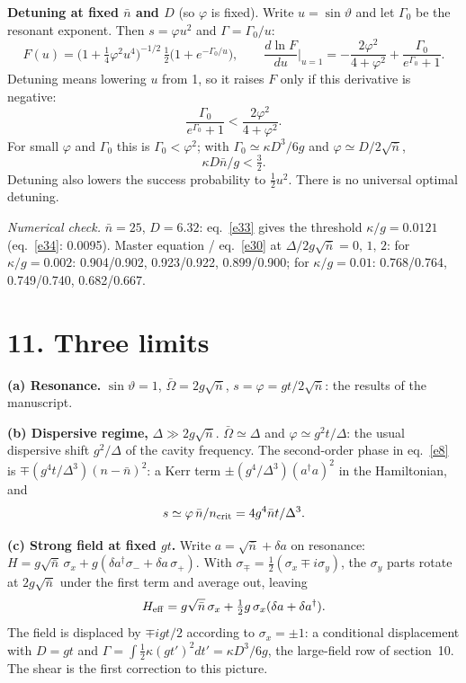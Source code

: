 \documentclass[11pt,letterpaper]{article}
\newcommand{\nbar}{\bar{n}}
\newcommand{\ncrit}{n_{\rm crit}}
\newcommand{\Obar}{\bar{\Omega}}
\newcommand{\numcheck}[1]{\par{\small\textit{Numerical check.} #1}\par}
\begin{document}
\textbf{Detuning at fixed $\nbar$ and $D$} (so $\varphi$ is fixed). Write $u=\sin\vartheta$ and let
$\Gamma_0$ be the resonant exponent. Then $s=\varphi u^2$ and $\Gamma=\Gamma_0/u$:
\[
F(u)=\bigl(1+\tfrac14\varphi^2u^4\bigr)^{-1/2}\,\tfrac12\bigl(1+e^{-\Gamma_0/u}\bigr),\qquad
\frac{d\ln F}{du}\Big|_{u=1}=-\frac{2\varphi^2}{4+\varphi^2}+\frac{\Gamma_0}{e^{\Gamma_0}+1}.
\]
Detuning means lowering $u$ from 1, so it raises $F$ only if this derivative is negative:
\begin{equation}\label{e33}
\frac{\Gamma_0}{e^{\Gamma_0}+1}<\frac{2\varphi^2}{4+\varphi^2}.
\end{equation}
For small $\varphi$ and $\Gamma_0$ this is $\Gamma_0<\varphi^2$; with $\Gamma_0\simeq\kappa D^3/6g$ and
$\varphi\simeq D/2\sqrt{\nbar}$,
\begin{equation}\label{e34}
\kappa D\nbar/g<\tfrac32 .
\end{equation}
Detuning also lowers the success probability to $\tfrac12u^2$. There is no universal optimal detuning.
\numcheck{$\nbar=25$, $D=6.32$: eq.~\eqref{e33} gives the threshold $\kappa/g=0.0121$ (eq.~\eqref{e34}: 0.0095). Master
equation / eq.~\eqref{e30} at $\Delta/2g\sqrt{\nbar}=0,\,1,\,2$: for $\kappa/g=0.002$: 0.904/0.902, 0.923/0.922,
0.899/0.900; for $\kappa/g=0.01$: 0.768/0.764, 0.749/0.740, 0.682/0.667.}

\section*{11. Three limits}
\textbf{(a) Resonance.} $\sin\vartheta=1$, $\Obar=2g\sqrt{\nbar}$, $s=\varphi=gt/2\sqrt{\nbar}$: the results
of the manuscript.

\textbf{(b) Dispersive regime,} $\Delta\gg2g\sqrt{\nbar}$. $\Obar\simeq\Delta$ and
$\varphi\simeq g^2t/\Delta$: the usual dispersive shift $g^2/\Delta$ of the cavity frequency. The
second-order phase in eq.~\eqref{e8} is $\mp(g^4t/\Delta^3)(n-\nbar)^2$: a Kerr term $\pm(g^4/\Delta^3)(a^\dagger a)^2$
in the Hamiltonian, and
\begin{equation}\label{e35}
s\simeq\varphi\,\nbar/\ncrit=4g^4\nbar t/\Delta^3 .
\end{equation}

\textbf{(c) Strong field at fixed $gt$.} Write $a=\sqrt{\nbar}+\delta a$ on resonance:
$H=g\sqrt{\nbar}\,\sigma_x+g(\delta a^\dagger\sigma_-+\delta a\,\sigma_+)$. With
$\sigma_\mp=\tfrac12(\sigma_x\mp i\sigma_y)$, the $\sigma_y$ parts rotate at $2g\sqrt{\nbar}$ under the
first term and average out, leaving
\begin{equation}\label{e36}
H_{\rm eff}=g\sqrt{\nbar}\,\sigma_x+\tfrac12g\,\sigma_x(\delta a+\delta a^\dagger).
\end{equation}
The field is displaced by $\mp igt/2$ according to $\sigma_x=\pm1$: a conditional displacement
with $D=gt$ and $\Gamma=\int\tfrac12\kappa(gt')^2dt'=\kappa D^3/6g$, the large-field row of section~10.
The shear is the first correction to this picture.
\end{document}

